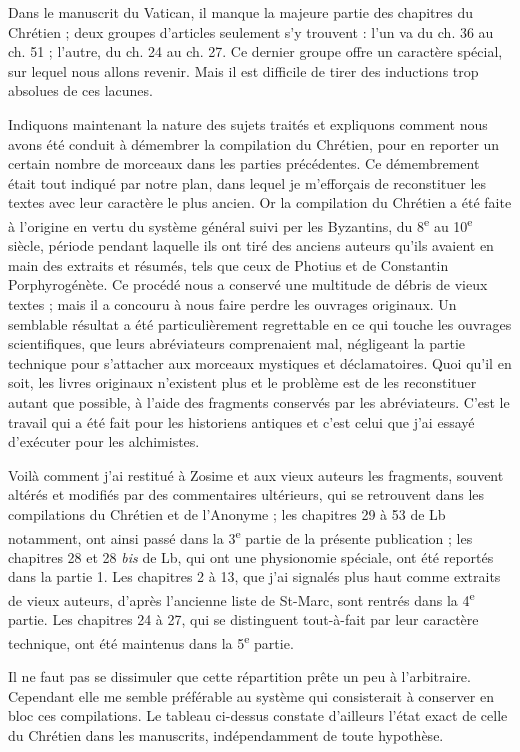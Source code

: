 \documentclass[a4paper, 11pt, oneside, polutonikogreek, french]{article}
\begin{document}
Dans le manuscrit du Vatican, il manque la majeure partie des chapitres du Chrétien ; deux groupes d'articles seulement s'y trouvent : l'un va du ch. 36 au ch. 51 ; l'autre, du ch. 24 au ch. 27. Ce dernier groupe offre un caractère spécial, sur lequel nous allons revenir. Mais il est difficile de tirer des inductions trop absolues de ces lacunes.

Indiquons maintenant la nature des sujets traités et expliquons comment nous avons été conduit à démembrer la compilation du Chrétien, pour en reporter un certain nombre de morceaux dans les parties précédentes. Ce démembrement était tout indiqué par notre plan, dans lequel je m'efforçais de reconstituer les textes avec leur caractère le plus ancien. Or la compilation du Chrétien a été faite à l'origine en vertu du système général suivi per les Byzantins, du 8\textsuperscript{e} au 10\textsuperscript{e} siècle, période pendant laquelle ils ont tiré des anciens auteurs qu'ils avaient en main des extraits et résumés, tels que ceux de Photius et de Constantin Porphyrogénète. Ce procédé nous a conservé une multitude de débris de vieux textes ; mais il a concouru à nous faire perdre les ouvrages originaux. Un semblable résultat a été particulièrement regrettable en ce qui touche les ouvrages scientifiques, que leurs abréviateurs comprenaient mal, négligeant la partie technique pour s'attacher aux morceaux mystiques et déclamatoires. Quoi qu'il en soit, les livres originaux n'existent plus et le problème est de les reconstituer autant que possible, à l'aide des fragments conservés par les abréviateurs. C'est le travail qui a été fait pour les historiens antiques et c'est celui que j'ai essayé d'exécuter pour les alchimistes.

Voilà comment j'ai restitué à Zosime et aux vieux auteurs les fragments, souvent altérés et modifiés par des commentaires ultérieurs, qui se retrouvent dans les compilations du Chrétien et de l'Anonyme ; les chapitres 29 à 53 de Lb notamment, ont ainsi passé dans la 3\textsuperscript{e} partie de la présente publication ; les chapitres 28 et 28 \emph{bis} de Lb, qui ont une physionomie spéciale, ont été reportés dans la partie 1. Les chapitres 2 à 13, que j'ai signalés plus haut comme extraits de vieux auteurs, d'après l'ancienne liste de St-Marc, sont rentrés dans la 4\textsuperscript{e} partie. Les chapitres 24 à 27, qui se distinguent tout-à-fait par leur caractère technique, ont été maintenus dans la 5\textsuperscript{e} partie.

Il ne faut pas se dissimuler que cette répartition prête un peu à l'arbitraire. Cependant elle me semble préférable au système qui consisterait à conserver en bloc ces compilations. Le tableau ci-dessus constate d'ailleurs l'état exact de celle du Chrétien dans les manuscrits, indépendamment de toute hypothèse.
\end{document}
